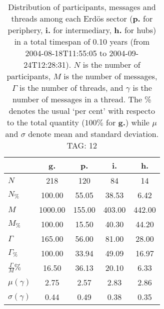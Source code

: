 \begin{table}[h!]
\begin{center}
\begin{tabular}{| l || c | c | c | c |}\hline
 & {\bf g.} & {\bf p.} & {\bf i.} & {\bf h.} \\\hline\hline
$N$ & 218  & 120  & 84  & 14 \\
$N_{\%}$ & 100.00  & 55.05  & 38.53  & 6.42 \\\hline
$M$ & 1000.00  & 155.00  & 403.00  & 442.00 \\
$M_{\%}$ & 100.00  & 15.50  & 40.30  & 44.20 \\\hline
$\Gamma$ & 165.00  & 56.00  & 81.00  & 28.00 \\
$\Gamma_{\%}$ & 100.00  & 33.94  & 49.09  & 16.97 \\\hline
$\frac{\Gamma}{M}\%$ & 16.50  & 36.13  & 20.10  & 6.33 \\
$\mu(\gamma)$ & 2.75  & 2.57  & 2.83  & 2.86 \\
$\sigma(\gamma)$ & 0.44  & 0.49  & 0.38  & 0.35 \\\hline
\end{tabular}
\caption{Distribution of participants, messages and threads among each Erd\"os sector ({\bf p.} for periphery, {\bf i.} for intermediary, 
    {\bf h.} for hubs) in a total timespan of 0.10 years (from 2004-08-18T11:55:05 to 2004-09-24T12:28:31). $N$ is the number of participants, $M$ is the number of messages, $\Gamma$ is the number of threads, and $\gamma$ is the number of messages in a thread.
    The \% denotes the usual `per cent' with respecto to the total quantity ($100\%$ for {\bf g.})
    while $\mu$ and $\sigma$ denote mean and standard deviation. TAG: 12}
\end{center}
\end{table}